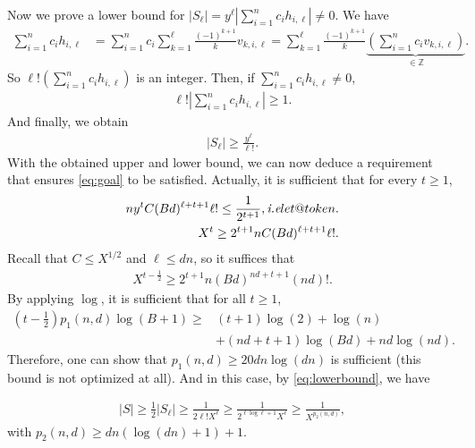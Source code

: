 \documentclass[a4paper, 11pt,dvipsnames]{article}
\makeatletter
\DeclareRobustCommand\onedot{\futurelet\@let@token\@onedot}
\def\@onedot{\ifx\@let@token.\else.\null\fi\xspace}
\def\ie{\emph{i.e}\onedot} \def\Ie{\emph{I.e}\onedot}
\makeatother
\begin{document}
            Now we prove a lower bound for $\left| S_\ell \right| = y^\ell \left| \sum_{i=1}^n
          c_i h_{i,\ell}\right| \neq 0$. We have \begin{align*} \sum_{i=1}^n c_i h_{i,\ell} &= \sum_{i=1}^n c_i \sum_{k = 1}^{\ell} \frac{(-1)^{k+1}}{k} v_{k,i,\ell} = \sum_{k = 1}^{\ell}
           \frac{(-1)^{k+1}}{k}  \underbrace{\left( \sum_{i=1}^n c_i v_{k,i,\ell}  \right)}_{\in \mathbb{Z}}.  \end{align*}
So $\ell! \left( \sum_{i=1}^n c_i h_{i,\ell} \right)$ is an integer. Then, if $\sum_{i=1}^n c_i h_{i,\ell} \neq 0$, 
            \begin{align*} \ell! \left| \sum_{i=1}^n c_i h_{i,\ell} \right| \ge
            1. \end{align*} And finally, we obtain \begin{align*} \left| S_\ell \right| \ge \frac{y^\ell}{\ell!}. \end{align*}
		With the obtained upper and lower bound, we can now deduce a requirement that ensures \cref{eq:goal} to be satisfied. Actually, it is sufficient
            that for every $t \ge 1$, \begin{align} ny^t C (Bd)^{\ell+t+1} \ell! \le \frac{1}{2^{t+1}}, \ie \\ X^t \ge 2^{t+1}n C (Bd)^{\ell+t+1} \ell!.
            \label{eq:bound_log_X} \end{align} 
            Recall that $C \le X^{1/2} $ and $\ell \le dn$, so it suffices that 
            \begin{align*}
                X^{t - \frac{1}{2}} \ge 2^{t+1}n(Bd)^{nd + t +1}(nd)!.   
            \end{align*}
            By applying $\log$, it is sufficient that for all $t \ge 1$,
            \begin{align*}
                (t- \frac{1}{2})p_1(n,d)\log(B+1) \ge &(t+1)\log(2) + \log(n)   \\& +(nd + t+1)\log(Bd)  + nd \log(nd). 
            \end{align*}
            Therefore, one can show that $p_1(n,d) \ge 20 dn \log(dn)  $ is sufficient (this bound is
            not optimized at all). And in this case, by \cref{eq:lowerbound}, we have

            \begin{align*} \left| S \right| \ge \frac{1}{2}  \left| S_\ell \right| \ge \frac{1}{2 \ell! X^\ell} \ge \frac{1}{2^{\ell\log \ell +1} X^\ell} \ge
            \frac{1}{X^{p_2(n,d)}}, \end{align*} with $p_2(n,d) \ge dn (\log (dn)+ 1 ) +1 $.
\end{document}
